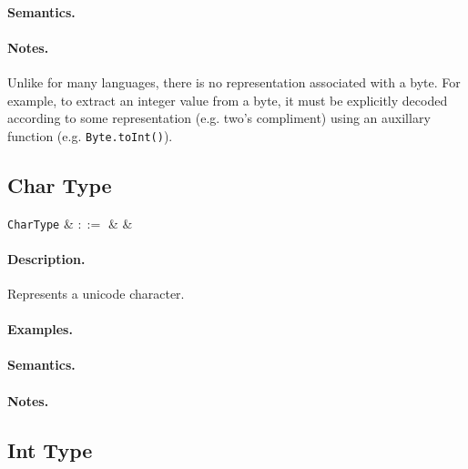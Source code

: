 \paragraph{Semantics.}

\paragraph{Notes.}  Unlike for many languages, there is no
representation associated with a byte. For example, to extract an
integer value from a byte, it must be explicitly decoded according to
some representation (e.g. two's compliment) using an auxillary function (e.g. \lstinline{Byte.toInt()}).



\subsection{Char Type}

\begin{syntax}
  \verb+CharType+ & $::=$ &  & \\
\end{syntax}

\paragraph{Description.}  Represents a unicode character.

\paragraph{Examples.}

\paragraph{Semantics.}

\paragraph{Notes.} 


\subsection{Int Type}

